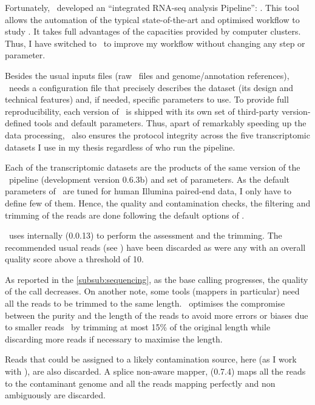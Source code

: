 Fortunately, \nuno\ developed
an ``integrated RNA-seq analysis Pipeline'':
.
This tool allows the automation of the typical
state-of-the-art and optimised workflow to study
\Rnaseq. It takes full advantages of the capacities provided by computer clusters.
Thus, I have switched to \irap\ to improve my workflow without changing any step
or parameter.

Besides the usual inputs files (raw \Rnaseq\ files and genome/annotation
references), \irap\ needs a configuration file that precisely describes the
dataset (its design and technical features) and, if needed, specific parameters
to use.
To provide full reproducibility,
each version of \irap\ is shipped with
its own set of third-party version-defined tools and default parameters.
Thus, apart of remarkably speeding up the data processing,
\irap\ also ensures the protocol integrity
across the five transcriptomic datasets I use
in my thesis regardless of who run the pipeline.

Each of the transcriptomic datasets are the products of the same version of
the \irap\ pipeline (development version 0.6.3b) and set of parameters. As the
default parameters of \irap\ are tuned for human Illumina paired-end data,
I only have to define few of them. Hence, the quality and contamination checks,
the filtering and trimming of the reads are done following the default options
of \irap.

\irap\ uses internally
 (0.0.13)
to perform the
assessment and the trimming. The recommended usual reads (see )
have been discarded as were any with an overall quality score above
a threshold of 10.

As reported in the \cref{subsub:sequencing}, as the base calling progresses,
the quality of the call decreases.
On another note, some tools (mappers in particular) need
all the reads to be trimmed to the same length. \irap\ optimises the compromise
between the purity and the length of the reads to avoid more errors or
biases due to smaller reads~ by trimming at most 15\% of the
original length while discarding more reads if necessary to maximise the length.

Reads that could be assigned to a likely contamination source, here
 (as I work with ),
are also discarded. A splice non-aware mapper,
 (0.7.4) maps all the reads to the
contaminant genome and all the reads mapping perfectly and non ambiguously are
discarded.

